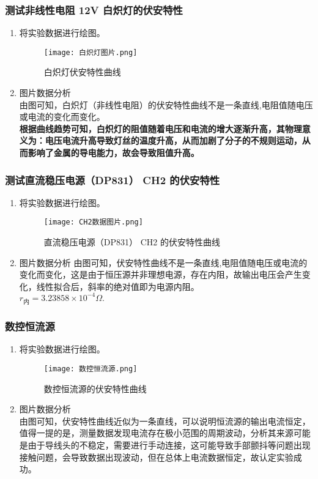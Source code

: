 \documentclass[dvipsnames, svgnames,a4paper,11pt]{article}
\begin{document}
	\subsubsection{测试非线性电阻 12V 白炽灯的伏安特性}
	\begin{enumerate}
		\item 将实验数据进行绘图。
			\begin{figure}[H]
			\centering
			\texttt{[image: 白炽灯图片.png]}
			\caption{白炽灯伏安特性曲线}
			\label{白炽灯伏安特性曲线}
		\end{figure}
		\item 图片数据分析\\
		由图可知，白炽灯（非线性电阻）的伏安特性曲线不是一条直线,电阻值随电压或电流的变化而变化。\\
		\textbf{根据曲线趋势可知，白炽灯的阻值随着电压和电流的增大逐渐升高，其物理意义为：电压电流升高导致灯丝的温度升高，从而加剧了分子的不规则运动，从而影响了金属的导电能力，故会导致阻值升高。}
		
	\end{enumerate}
	
	\subsubsection{测试直流稳压电源（DP831） CH2 的伏安特性}
	\begin{enumerate}
		\item 将实验数据进行绘图。
		\begin{figure}[H]
			\centering
			\texttt{[image: CH2数据图片.png]}
			\caption{直流稳压电源（DP831） CH2 的伏安特性曲线}
			\label{CH2数据图片}
		\end{figure}
		\item 图片数据分析\quad
		由图可知，伏安特性曲线不是一条直线,电阻值随电压或电流的变化而变化，这是由于恒压源并非理想电源，存在内阻，故输出电压会产生变化，线性拟合后，斜率的绝对值即为电源内阻。\\
		$r_\text{内}=3.23858\times10^{-4}\Omega.$
		
	\end{enumerate}
		\subsubsection{数控恒流源}
	\begin{enumerate}
		\item 将实验数据进行绘图。
		\begin{figure}[H]
			\centering
			\texttt{[image: 数控恒流源.png]}
			\caption{数控恒流源的伏安特性曲线}
			\label{数控恒流源}
		\end{figure}
		\item 图片数据分析\\
		由图可知，伏安特性曲线近似为一条直线，可以说明恒流源的输出电流恒定，值得一提的是，测量数据发现电流存在极小范围的周期波动，分析其来源可能是由于导线头的不稳定，需要进行手动连接，这可能导致手部颤抖等问题出现接触问题，会导致数据出现波动，但在总体上电流数据恒定，故认定实验成功。
	
	\end{enumerate}
\end{document}
